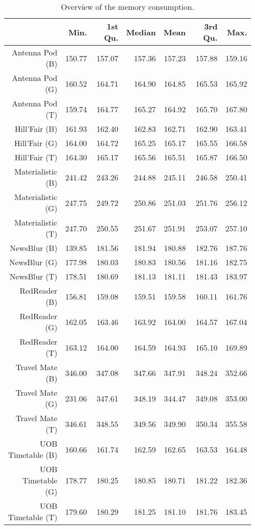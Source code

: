 \begin{table}[ht]
\centering
\begin{tabular}{rrrrrrr}
  \hline
 & Min. & 1st Qu. & Median & Mean & 3rd Qu. & Max. \\ 
  \hline
Antenna Pod (B) & 150.77 & 157.07 & 157.36 & 157.23 & 157.88 & 159.16 \\ 
  Antenna Pod (G) & 160.52 & 164.71 & 164.90 & 164.85 & 165.53 & 165.92 \\ 
  Antenna Pod (T) & 159.74 & 164.77 & 165.27 & 164.92 & 165.70 & 167.80 \\ 
  Hill'Fair (B) & 161.93 & 162.40 & 162.83 & 162.71 & 162.90 & 163.41 \\ 
  Hill'Fair (G) & 164.00 & 164.72 & 165.25 & 165.17 & 165.55 & 166.58 \\ 
  Hill'Fair (T) & 164.30 & 165.17 & 165.56 & 165.51 & 165.87 & 166.50 \\ 
  Materialistic (B) & 241.42 & 243.26 & 244.88 & 245.11 & 246.58 & 250.41 \\ 
  Materialistic (G) & 247.75 & 249.72 & 250.86 & 251.03 & 251.76 & 256.12 \\ 
  Materialistic (T) & 247.70 & 250.55 & 251.67 & 251.91 & 253.07 & 257.10 \\ 
  NewsBlur (B) & 139.85 & 181.56 & 181.94 & 180.88 & 182.76 & 187.76 \\ 
  NewsBlur (G) & 177.98 & 180.03 & 180.83 & 180.56 & 181.16 & 182.75 \\ 
  NewsBlur (T) & 178.51 & 180.69 & 181.13 & 181.11 & 181.43 & 183.97 \\ 
  RedReader (B) & 156.81 & 159.08 & 159.51 & 159.58 & 160.11 & 161.76 \\ 
  RedReader (G) & 162.05 & 163.46 & 163.92 & 164.00 & 164.57 & 167.04 \\ 
  RedReader (T) & 163.12 & 164.00 & 164.59 & 164.93 & 165.10 & 169.89 \\ 
  Travel Mate (B) & 346.00 & 347.08 & 347.66 & 347.91 & 348.24 & 352.66 \\ 
  Travel Mate (G) & 231.06 & 347.61 & 348.19 & 344.47 & 349.08 & 353.00 \\ 
  Travel Mate (T) & 346.61 & 348.55 & 349.56 & 349.90 & 350.34 & 355.58 \\ 
  UOB Timetable (B) & 160.66 & 161.74 & 162.59 & 162.65 & 163.53 & 164.48 \\ 
  UOB Timetable (G) & 178.77 & 180.25 & 180.85 & 180.71 & 181.22 & 182.36 \\ 
  UOB Timetable (T) & 179.60 & 180.29 & 181.25 & 181.10 & 181.76 & 183.45 \\ 
   \hline
\end{tabular}
\caption{Overview of the memory consumption.} 
\label{tab:results:rq1:summary:memory}
\end{table}
